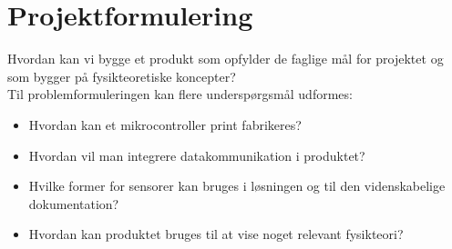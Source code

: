 \section{Projektformulering}

Hvordan kan vi bygge et produkt som opfylder de faglige mål for projektet og som bygger på fysikteoretiske koncepter?\\

Til problemformuleringen kan flere underspørgsmål udformes:
\begin{itemize}
\item Hvordan kan et mikrocontroller print fabrikeres?
\item Hvordan vil man integrere datakommunikation i produktet? 
\item Hvilke former for sensorer kan bruges i løsningen og til den videnskabelige dokumentation?
\item Hvordan kan produktet bruges til at vise noget relevant fysikteori?
\end{itemize}

